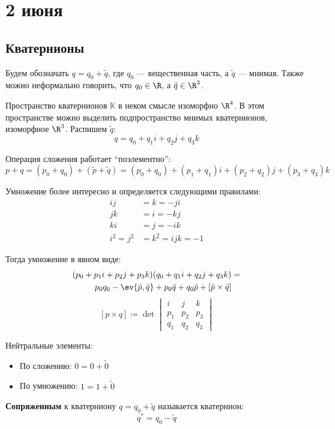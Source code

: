 \chapter{2 июня}

\section{Кватернионы}

Будем обозначать $q = q_0 + \tilde{q}$, где $q_0$ --- вещественная часть, а $\tilde{q}$ --- мнимая.
Также можно неформально говорить, что $q_0 \in \R$, а $\tilde{q} \in \R^3$.

Пространство кватернионов $\mathbb{K}$ в неком смысле изоморфно $\R^4$.
В этом пространстве можно выделить подпространство мнимых кватернионов, изоморфное $\R^3$.
Распишем $\tilde{q}$:
\[q = q_0 + q_1 i + q_2 j + q_3 k\]

Операция сложения работает ``поэлементно'':
\[p + q = (p_0 + q_0) + (\tilde{p} + \tilde{q}) = (p_0 + q_0) + (p_1 + q_1)i + (p_2 + q_2)j + (p_3 + q_3)k\]

Умножение более интересно и определяется следующими правилами:
\begin{align*}
	ij        & = k = -ji        \\
	jk        & = i = -kj        \\
	ki        & = j = -ik        \\
	i^2 = j^2 & = k^2 = ijk = -1
\end{align*}

Тогда умножение в явном виде:
\begin{align*}
	(p_0 + p_1 i + p_2 j + p_3 k) (q_0 + q_1 i + q_2 j + q_3 k) & = \\
	p_0 q_0 - \ev{\tilde{p}, \tilde{q}} + p_0 \tilde{q} + q_0 \tilde{p} + [\tilde{p} \times \tilde{q}]
\end{align*}
\[
	[p \times q] \coloneqq \det \begin{vmatrix} i & j & k \\ p_1 & p_2 & p_3 \\ q_1 & q_2 & q_3 \end{vmatrix}
\]

Нейтральные элементы:
\begin{itemize}
	\item По сложению: $0 = 0 + \tilde{0}$
	\item По умножению: $1 = 1 + \tilde{0}$
\end{itemize}

\begin{definition}
	\textbf{Сопряженным} к кватерниону $q = q_0 + \tilde{q}$ называется кватернион:
	\[q^* = q_0 - \tilde{q}\]
\end{definition}


